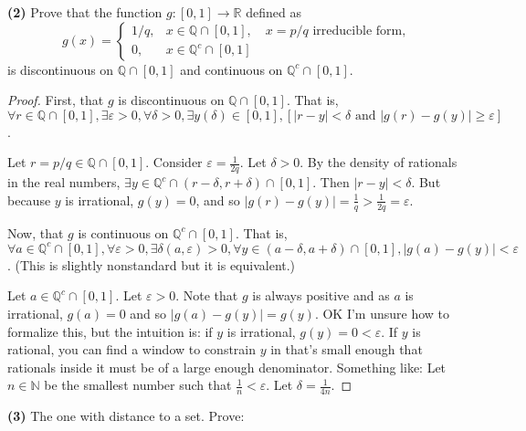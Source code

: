 \documentclass{article}
\newcommand{\R}{\mathbb{R}}
\newcommand{\N}{\mathbb{N}}
\newcommand{\Q}{\mathbb{Q}}
\newcommand{\abs}[1]{\left| #1 \right|}
\newcommand{\brac}[1]{\left[ #1 \right]}
\begin{document}
\newpage %

\textbf{(2) }
Prove that the function $g : [0, 1] \to \R$ defined as
$$g(x) = \begin{cases}
    1/q, & x \in \Q \cap [0, 1], \quad x = p/q \text{ irreducible form}, \\
    0, & x \in \Q^c \cap [0, 1]
\end{cases}$$
is discontinuous on $\Q \cap [0, 1]$ and continuous on $\Q^c \cap [0, 1]$.
\begin{proof}
    First, that $g$ is discontinuous on $\Q \cap [0, 1]$. That is, $\forall r \in \Q \cap [0, 1], \exists \varepsilon > 0, \forall \delta > 0, \exists y(\delta) \in [0, 1], \brac{\abs{r - y} < \delta \text{ and } \abs{g(r) - g(y)} \ge \varepsilon}$. 

    Let $r = p/q \in \Q \cap [0, 1]$. Consider $\varepsilon = \frac{1}{2q}$. Let $\delta > 0$. By the density of rationals in the real numbers, $\exists y \in \Q^c \cap (r - \delta, r + \delta) \cap [0, 1]$. Then $\abs{r - y} < \delta$. But because $y$ is irrational, $g(y) = 0$, and so $\abs{g(r) - g(y)} = \frac{1}{q} > \frac{1}{2q} = \varepsilon$. 

    Now, that $g$ is continuous on $\Q^c \cap [0, 1]$. That is, $\forall a \in \Q^c \cap [0, 1], \forall \varepsilon > 0, \exists \delta(a, \varepsilon) > 0, \forall y \in (a - \delta, a + \delta) \cap [0, 1], \abs{g(a) - g(y)} < \varepsilon$. (This is slightly nonstandard but it is equivalent.)

    Let $a \in \Q^c \cap [0, 1]$. Let $\varepsilon > 0$. Note that $g$ is always positive and as $a$ is irrational, $g(a) = 0$ and so $\abs{g(a) - g(y)} = g(y)$. OK I'm unsure how to formalize this, but the intuition is: if $y$ is irrational, $g(y) = 0 < \varepsilon$. If $y$ is rational, you can find a window to constrain $y$ in that's small enough that rationals inside it must be of a large enough denominator. Something like: 
    Let $n \in \N$ be the smallest number such that $\frac{1}{n} < \varepsilon$. Let $\delta = \frac{1}{4n}$. 
\end{proof}


\newpage %

\textbf{(3) }
The one with distance to a set. Prove:
\end{document}
